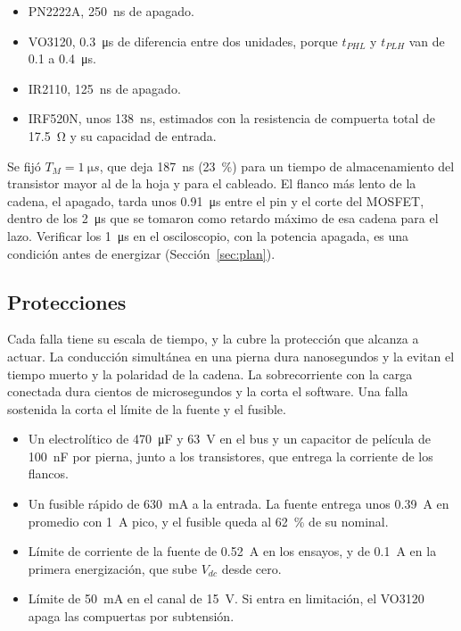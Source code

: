 \documentclass[journal]{IEEEtran}
\begin{document}
\begin{itemize}
	\item PN2222A, \SI{250}{ns} de apagado.
	\item VO3120, \SI{0.3}{\micro s} de diferencia entre dos unidades, porque $t_{PHL}$ y $t_{PLH}$ van de \num{0.1} a \SI{0.4}{\micro s}.
	\item IR2110, \SI{125}{ns} de apagado.
	\item IRF520N, unos \SI{138}{ns}, estimados con la resistencia de compuerta total de \SI{17.5}{\ohm} y su capacidad de entrada.
\end{itemize}

Se fijó $T_M=\SI{1}{\micro s}$, que deja \SI{187}{ns} (\SI{23}{\percent}) para un tiempo de almacenamiento del transistor mayor al de la hoja y para el cableado. El flanco más lento de la cadena, el apagado, tarda unos \SI{0.91}{\micro s} entre el pin y el corte del MOSFET, dentro de los \SI{2}{\micro s} que se tomaron como retardo máximo de esa cadena para el lazo. Verificar los \SI{1}{\micro s} en el osciloscopio, con la potencia apagada, es una condición antes de energizar (Sección~\ref{sec:plan}).

\subsection{Protecciones}
\label{sec:prot}
Cada falla tiene su escala de tiempo, y la cubre la protección que alcanza a actuar. La conducción simultánea en una pierna dura nanosegundos y la evitan el tiempo muerto y la polaridad de la cadena. La sobrecorriente con la carga conectada dura cientos de microsegundos y la corta el software. Una falla sostenida la corta el límite de la fuente y el fusible.

\begin{itemize}
	\item Un electrolítico de \SI{470}{\micro F} y \SI{63}{V} en el bus y un capacitor de película de \SI{100}{nF} por pierna, junto a los transistores, que entrega la corriente de los flancos.
	\item Un fusible rápido de \SI{630}{mA} a la entrada. La fuente entrega unos \SI{0.39}{A} en promedio con \SI{1}{A} pico, y el fusible queda al \SI{62}{\percent} de su nominal.
	\item Límite de corriente de la fuente de \SI{0.52}{A} en los ensayos, y de \SI{0.1}{A} en la primera energización, que sube $V_{dc}$ desde cero.
	\item Límite de \SI{50}{mA} en el canal de \SI{15}{V}. Si entra en limitación, el VO3120 apaga las compuertas por subtensión.
\end{itemize}
\end{document}
